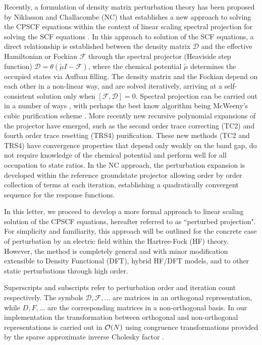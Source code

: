 \documentclass[prl,aps,twocolumn,showpacs,twocolumngrid,superbib]{revtex4}
\begin{document}
Recently, a formulation of density matrix perturbation theory has been proposed 
by Niklasson and Challacombe (NC) \cite{ANiklasson04} that establishes a new approach to solving 
the CPSCF equations within the context of linear scaling spectral projection for solving the SCF 
equations \cite{ANiklasson02A,ANiklasson03}.  
In this approach to solution of the SCF equations, a direct relationship is established between 
the density matrix $\mathcal{D}$  and the effective Hamiltonian or Fockian $\mathcal{F}$ through 
the spectral projector (Heaviside step function) $\mathcal{D}=\theta(\tilde{\mu}I-\mathcal{F})$, 
where the chemical potential $\tilde{\mu}$ determines the occupied states via Aufbau filling.   
The density matrix and the Fockian depend on each other in a non-linear way, and are solved
iteratively, arriving at a self-consistent solution only when $[\mathcal{F},\mathcal{D}]=0$.
Spectral projection can be carried out in a number of ways 
\cite{ANiklasson02A,ANiklasson03,RMcWeeny60,APalser98,GBeylkin99}, 
with perhaps the best know algorithm being McWeeny's cubic purification scheme \cite{RMcWeeny60}. 
More recently new recursive polynomial expansions of the projector have emerged, 
such as the second order trace correcting (TC2) \cite{ANiklasson02A} and fourth order trace resetting 
(TRS4) \cite{ANiklasson03} purification.  These new methods (TC2 and TRS4) have convergence properties 
that depend only weakly on the band gap, do not require knowledge of the chemical potential
and perform well for all occupation to state ratios. In the NC approach, 
the perturbation expansion is developed within the reference groundstate projector allowing 
order by order collection of terms at each iteration, establishing a quadratically convergent 
sequence for the response functions.  

In this letter, we proceed to develop a more formal approach to linear scaling solution of the CPSCF 
equations, hereafter referred to as ``perturbed projection".  For simplicity and familiarity, this approach 
will be outlined for the concrete case of perturbation by an electric field within the Hartree-Fock (HF) theory.  
However, the method is completely general and with minor modification extensible to Density Functional (DFT), 
hybrid HF/DFT models, and to other static perturbations through high order.

Superscripts and subscripts refer to perturbation order and iteration count respectively.  
The symbols $\mathcal{D},\mathcal{F},\dots$  are  matrices in an orthogonal representation, while
$D,F,\dots$ are the corresponding matrices in a non-orthogonal basis.  In our implementation the 
transformation between orthogonal and non-orthogonal representations is carried out in ${\cal O}(N)$ using
congruence transformations \cite{JWilkinson65,GStewart73} provided by the sparse approximate inverse 
Cholesky factor \cite{MBenzi95,MBenzi96,MBenzi01}.  
\end{document}
